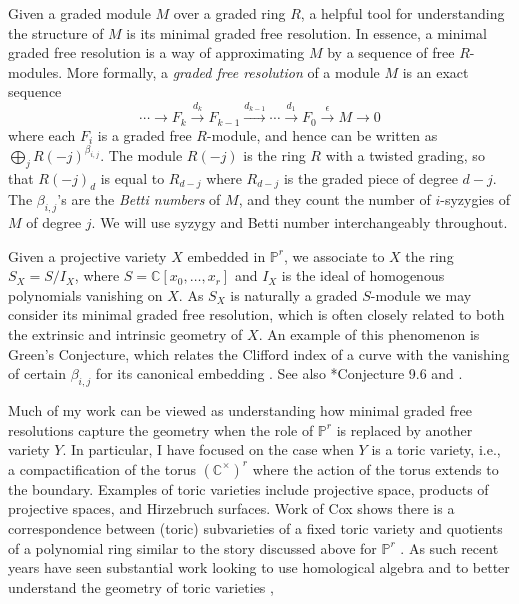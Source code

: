 \documentclass[11pt,reqno]{amsart}
\theoremstyle{remark}
\newcommand{\C}{\mathbb{C}}
\renewcommand{\P}{\mathbb{P}}
\begin{document}
Given a graded module $M$ over a graded ring $R$, a helpful tool for understanding the structure of $M$ is its minimal graded free resolution. In essence, a minimal graded free resolution is a way of approximating $M$ by a sequence of free $R$-modules. More formally, a \textit{graded free resolution} of a module $M$ is an exact sequence 
\[
\cdots \xrightarrow{} F_{k} \xrightarrow{d_{k}} F_{k-1} \xrightarrow{d_{k-1}} \cdots \xrightarrow{d_{1}} F_{0}\xrightarrow{\epsilon}M\xrightarrow{} 0
\]
where each $F_{i}$ is a graded free $R$-module, and hence can be written as $\bigoplus_{j}R(-j)^{\beta_{i,j}}$. The module $R(-j)$ is the ring $R$ with a twisted grading, so that $R(-j)_{d}$ is equal to $R_{d-j}$ where $R_{d-j}$ is the graded piece of degree $d-j$. The $\beta_{i,j}$'s are the \textit{Betti numbers} of $M$, and they count the number of $i$-syzygies of $M$ of degree $j$. We will use syzygy and Betti number interchangeably throughout. 

Given a projective variety $X$ embedded in $\P^r$, we associate to $X$ the ring $S_X=S/I_X$, where $S=\C[x_0,\ldots,x_r]$ and $I_X$ is the ideal of homogenous polynomials vanishing on $X$. As $S_X$ is naturally a graded $S$-module we may consider its minimal graded free resolution, which is often closely related to both the extrinsic and intrinsic geometry of $X$.  An example of this phenomenon
 is Green's Conjecture, which relates the Clifford index of a curve with the vanishing of certain $\beta_{i,j}$ for its canonical embedding \cite{voisin02, voisin05, aproduFarkas19}. See also \cite{eisenbud05}*{Conjecture 9.6} and \cite{schreyer86, bayerEisenbud91,farkasPopa05, farkas06,aproduFarkas11,farkasKemeny16,farkasKemeny17}.
 
 Much of my work can be viewed as understanding how minimal graded free resolutions capture the geometry when the role of $\P^{r}$ is replaced by another variety $Y$. In particular, I have focused on the case when $Y$ is a toric variety, i.e., a compactification of the torus $(\C^{\times})^{r}$ where the action of the torus extends to the boundary. Examples of toric varieties include projective space, products of projective spaces, and Hirzebruch surfaces. Work of Cox shows there is a correspondence between (toric) subvarieties of a fixed toric variety and quotients of a polynomial ring similar to the story discussed above for $\P^{r}$ \cite{cox95}. As such recent years have seen substantial work looking to use homological algebra and to better understand the geometry of toric varieties \cite{almousaBruce19,berkeschErmanSmith17,brownErman22,brownErman23,BB21,cartwrightErmanVelscoViray09,EES15,GVT15,maclaganSmith04,maclaganSmith05},
\end{document}
